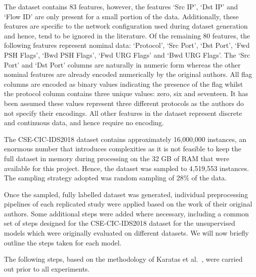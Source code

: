 The dataset contains 83 features, however, the features `Src IP', `Dst IP' and
`Flow ID' are only present for a small portion of the data. Additionally, these
features are specific to the network configuration used during dataset
generation and hence, tend to be ignored in the literature. Of the remaining 80
features, the following features represent nominal data: `Protocol', `Src
Port', `Dst Port', `Fwd PSH Flags', `Bwd PSH Flags', `Fwd URG Flags' and `Bwd
URG Flags'. The `Src Port' and `Dst Port' columns are naturally in numeric form
whereas the other nominal features are already encoded numerically by the
original authors. All flag columns are encoded as binary values indicating the
presence of the flag whilst the protocol column contains three unique values:
zero, six and seventeen. It has been assumed these values represent three
different protocols as the authors do not specify their encodings. All other
features in the dataset represent discrete and continuous data, and hence
require no encoding.

The CSE-CIC-IDS2018 dataset contains approximately 16,000,000 instances, an
enormous number that introduces complexities as it is not feasible to keep the
full dataset in memory during processing on the 32 GB of RAM that were available
for this project. Hence, the dataset was sampled to 4,519,553 instances. The
sampling strategy adopted was random sampling of 28\% of the data.

Once the sampled, fully labelled dataset was generated, individual
preprocessing pipelines of each replicated study were applied based on the work
of their original authors. Some additional steps were added where necessary,
including a common set of steps designed for the CSE-CIC-IDS2018 dataset for
the unsupervised models which were originally evaluated on different datasets.
We will now briefly outline the steps taken for each model.

The following steps, based on the methodology of Karatas et al.~\cite{Karatas},
were carried out prior to all experiments.

